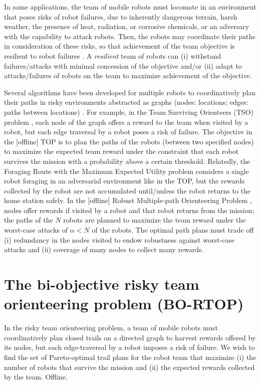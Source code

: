 \documentclass[11pt, oneside]{article}
\begin{document}
In some applications, the team of mobile robots must locomote in an environment that poses risks of robot failures, due to inherently dangerous terrain, harsh weather, the presence of heat, radiation, or corrosive chemicals, or an adversary with the capability to attack robots. Then, the robots may coordinate their paths in consideration of these risks, so that achievement of the team objective is resilient to robot failures \cite{zhou2021multi}. A \emph{resilient} team of robots can (i) withstand failures/attacks with minimal concession of the objective and/or (ii) adapt to attacks/failures of robots on the team to maximize achievement of the objective. 

Several algorithms have been developed for multiple robots to coordinatively plan their paths in risky environments abstracted as graphs (nodes: locations; edges: paths between locations) \cite{jorgensen2018team,shi2023robust,zhou2022distributed}. 
For example, in the Team Surviving Orienteers (TSO) problem \cite{jorgensen2018team}, each node of the graph offers a reward to the team when visited by a robot, but each edge traversal by a robot poses a risk of failure. The objective in the [offline] TOP is to plan the paths of the robots (between two specified nodes) to maximize the expected team reward under the constraint that each robot survives the mission with a probability above a certain threshold. 
Relatedly, the Foraging Route with the Maximum Expected Utility problem \cite{di2022foraging} considers a single robot foraging in an adversarial environment like in the TOP, but the rewards collected by the robot are not accumulated until/unless the robot returns to the home station safely.
In the [offline] Robust Multiple-path Orienteering Problem \cite{shi2023robust}, nodes offer rewards if visited by a robot and that robot returns from the mission; the paths of the $N$ robots are planned to maximize the team reward under the worst-case attacks of $\alpha<N$ of the robots. The optimal path plans must trade off (i) redundancy in the nodes visited to endow robustness against worst-case attacks and (ii) coverage of many nodes to collect many rewards.



\section{The bi-objective risky team orienteering problem (BO-RTOP)}
In the risky team orienteering problem, a team of mobile robots must coordinatively plan closed trails on a directed graph to harvest rewards offered by its nodes, but each edge-traversal by a robot imposes a risk of failure. 
We wish to find the set of Pareto-optimal trail plans for the robot team that maximize (i) the number of robots that survive the mission and (ii) the expected rewards collected by the team.
Offline.
\end{document}
